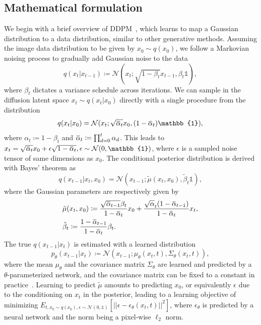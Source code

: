 \documentclass{article}
\newcommand{\overbar}[1]{\mkern 1.5mu\overline{\mkern-1.5mu#1\mkern-1.5mu}\mkern 1.5mu}
\begin{document}
\subsection{Mathematical formulation} \label{sec:ddpm}
We begin with a brief overview of DDPM~\cite{ho2020denoising}, which learns to map a Gaussian distribution to a data distribution, similar to other generative methods. Assuming the image data distribution to be given by $x_0\sim q(x_0)$, we follow a Markovian noising process to gradually add Gaussian noise to the data
\begin{equation}
    q(x_t|x_{t-1}) \coloneqq \mathcal{N}(x_t; \sqrt{1-\beta_t} x_{t-1}, \beta_t \mathbb{1}),
\end{equation}
where $\beta_t$ dictates a variance schedule across iterations.
We can sample in the diffusion latent space $x_t \sim q(x_t|x_0)$ directly with a single procedure from the distribution
\begin{equation} \label{eq:sampling}
    q(x_t|x_0) = \mathcal{N}(x_t; \sqrt{\overbar{\alpha}_t} x_0, (1-\overbar{\alpha}_t) \mathbb{1}),
\end{equation}
where $\alpha_t\coloneqq1-\beta_t$ and $\overbar{\alpha}_t \coloneqq \prod_{d=0}^{t} \alpha_d$. This leads to $x_t = \sqrt{\overbar{\alpha}_t} x_0 + \epsilon \sqrt{1-\overbar{\alpha}_t}, \epsilon \sim \mathcal{N}(0,\mathbb{1})$, where $\epsilon$ is a sampled noise tensor of same dimensions as $x_0$. The conditional posterior distribution is derived with Bayes' theorem as
\begin{equation}
    q(x_{t-1}|x_t,x_0) = \mathcal{N}(x_{t-1}; \tilde{\mu}(x_t,x_0), \tilde{\beta}_t\mathbb{1}),
\end{equation}
where the Gaussian parameters are respectively given by
\begin{equation}
    \begin{split}
        & \tilde{\mu}(x_t,x_0) \coloneqq \frac{\sqrt{\overbar{\alpha}_{t-1}}\beta_t}{1-\overbar{\alpha}_t}x_0 +
        \frac{\sqrt{\alpha}_t(1-\overbar{\alpha}_{t-1})}{1-\overbar{\alpha}_t}x_t, \\
        & \tilde{\beta}_t \coloneqq \frac{1-\overbar{\alpha}_{t-1}}{1-\overbar{\alpha}_t} \beta_t.
    \end{split}
\end{equation}
The true $q(x_{t-1}|x_t)$ is estimated with a learned distribution 
\begin{equation}
    p_\theta(x_{t-1}|x_t) \coloneqq \mathcal{N}(x_{t-1}; \mu_\theta(x_t,t), \Sigma_\theta(x_t,t)),
\end{equation}
where the mean $\mu_\theta$ and the covariance matrix $\Sigma_\theta$ are learned and predicted by a $\theta$-parameterized network, and the covariance matrix can be fixed to a constant in practice~\cite{ho2020denoising}. Learning to predict $\tilde{\mu}$ amounts to predicting $x_0$, or equivalently $\epsilon$ due to the conditioning on $x_t$ in the posterior, leading to a learning objective of minimizing ${E}_{t,x_0\sim q(x_0),\epsilon \sim \mathcal{N}(0,\mathbb{1})} [||\epsilon-\epsilon_{\theta}(x_t,t)||^2]$, where $\epsilon_{\theta}$ is predicted by a neural network and the norm being a pixel-wise $\ell_2$ norm. 
\end{document}
